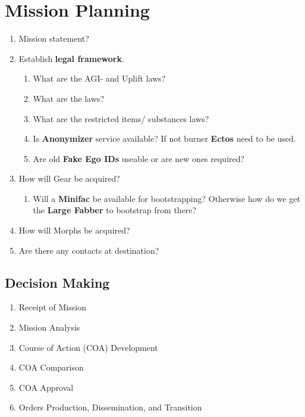 
\section{Mission Planning}

\begin{enumerate}
    \item Mission statement?
    \item Establish \textbf{legal framework}. 
    \begin{enumerate}
        \item What are the AGI- and Uplift laws?
        \item What are the  laws?
        \item What are the restricted items/ substances laws?
        \item Is \textbf{\gls{Anonymizer}} service available? If not burner \textbf{\glspl{Ecto}} need to be used.
        \item Are old \textbf{\glspl{Fake Ego ID}} useable or are new ones required?
    \end{enumerate}
    \item How will Gear be acquired?
    \begin{enumerate}
        \item Will a \textbf{\gls{Minifac}} be available for bootstrapping? Otherwise how do we get the \textbf{\gls{Large Fabber}} to bootstrap from there?
    \end{enumerate}
    \item How will Morphs be acquired?
    \item Are there any contacts at destination?
\end{enumerate}


\subsection{Decision Making}

\begin{enumerate}
    \item Receipt of Mission
    \item Mission Analysis
    \item Course of Action (COA) Development
    \item COA Comparison
    \item COA Approval
    \item Orders Production, Dissemination, and Transition
\end{enumerate}


